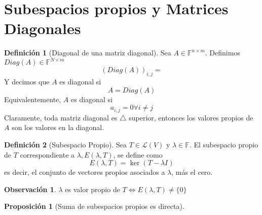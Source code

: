 \documentclass[11pt]{book}
\newcommand{\set}[1]{\mathbb{#1}}
\newtheorem{prop}[thm]{Proposición}
\theoremstyle{definition}
\newtheorem{defn}{Definición}[section]
\newtheorem{obs}{Observación}[section]
\begin{document}
\section{Subespacios propios y Matrices Diagonales}
\begin{defn}[Diagonal de una matriz diagonal]
	Sea $A\in\set{F}^{n\times m}$. Definimos $Diag(A)\in\set{F}^{N\times m}$
	\[(Diag(A))_{i,j}=\]
	Y decimos que $A$ es diagonal si
	\[A=Diag(A)\]
	Equivalentemente, $A$ es diagonal si
	\[a_{i,j}=0\forall i\neq j\]
	Claramente, toda matriz diagonal es $\triangle$ superior, entonces los valores propios de $A$ son los valores en la diagonal.
\end{defn}
\begin{defn}[Subespacio Propio]
	Sea $T\in\mathcal{L}(V)$ y $\lambda\in\set{F}$. El subespacio propio de $T$ correspondiente a $\lambda, E(\lambda,T)$, se define como
	\[E(\lambda,T)=\ker (T-\lambda I)\]
	es decir, el conjunto de vectores propios asociados a $\lambda$, más el cero.
	\begin{obs}
		$\lambda$ es valor propio de $T\iff E(\lambda, T)\neq \{0\}$
	\end{obs}
\end{defn}
\begin{prop}[Suma de subespacios propios es directa]

\end{prop}
\end{document}
